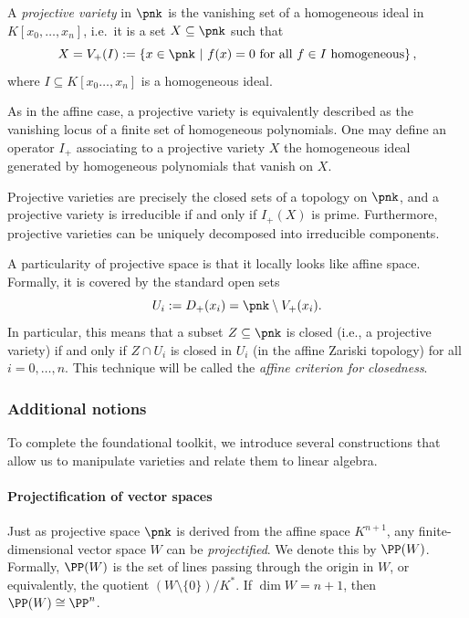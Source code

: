 \begin{defn}
    A \emph{projective variety} in $\pnk$ is the vanishing set of a homogeneous ideal in $K[x_0, \ldots, x_n]$, i.e.\ it is a set $X \subseteq \pnk$ such that
    \[ X = V_+(I) := \left\{x \in \pnk \ \middle| \ f(x) = 0 \text{ for all } f \in I 
    \text{ homogeneous}\right\},\]
    where $I \subseteq K[x_0 \ldots, x_n]$ is a homogeneous ideal.
\end{defn}

As in the affine case, a projective variety is equivalently described as the vanishing locus of a finite set of homogeneous polynomials. One may define an operator $I_+$ associating to a projective variety $X$ the homogeneous ideal generated by homogeneous polynomials that vanish on $X$.

Projective varieties are precisely the closed sets of a topology on $\pnk$, and a projective variety is irreducible if and only if $I_+(X)$ is prime. Furthermore, projective varieties can be uniquely decomposed into irreducible components.

A particularity of projective space is that it locally looks like affine space. Formally, it is covered by the standard open sets
\[ U_i := D_+(x_i) = \pnk \setminus V_+(x_i).\]
In particular, this means that a subset $Z \subseteq \pnk$ is closed (i.e., a projective variety) if and only if $Z \cap U_i$ is closed in $U_i$ (in the affine Zariski topology) for all $i=0, \ldots, n$. This technique will be called the \emph{affine criterion for closedness}.

\subsubsection{Additional notions}

To complete the foundational toolkit, we introduce several constructions that allow us to manipulate varieties and relate them to linear algebra.

\paragraph{Projectification of vector spaces}
Just as projective space $\pnk$ is derived from the affine space $K^{n+1}$, any finite-dimensional vector space $W$ can be \emph{projectified}. We denote this by $\PP(W)$. Formally, $\PP(W)$ is the set of lines passing through the origin in $W$, or equivalently, the quotient $(W \setminus \{0\}) / K^*$. If $\dim W = n+1$, then $\PP(W) \cong \PP^n$.


